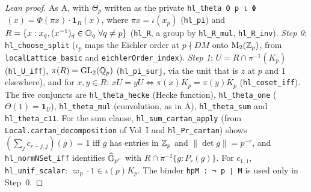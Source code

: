\begin{proof}[Lean proof]
As A, with $\Theta_p$ written as the private \texttt{hl\_theta O p ι Φ}$\,(x)=\Phi(\pi x)\cdot\mathbf 1_R(x)$, where $\pi x=\iota(x_p)$ (\texttt{hl\_pi}) and $R=\{x:x_q,(x^{-1})_q\in\mathbb{O}_q\ \forall q\neq p\}$ (\texttt{hl\_R}, a group by \texttt{hl\_R\_mul}, \texttt{hl\_R\_inv}). \emph{Step 0}: \texttt{hl\_choose\_split} ($\iota_p$ maps the Eichler order at $p\nmid DM$ onto $\mathrm{M}_2(\mathbb{Z}_p)$, from \texttt{localLattice\_basic} and \texttt{eichlerOrder\_index}). \emph{Step 1}: $U=R\cap\pi^{-1}(K_p)$ (\texttt{hl\_U\_iff}), $\pi(R)=\mathrm{GL}_2(\mathbb{Q}_p)$ (\texttt{hl\_pi\_surj}, via the unit that is $z$ at $p$ and $1$ elsewhere), and for $x,y\in R$: $xU=yU\iff\pi(x)K_p=\pi(y)K_p$ (\texttt{hl\_coset\_iff}). The five conjuncts are \texttt{hl\_theta\_hecke} (Hecke function), \texttt{hl\_theta\_one} ($\Theta(1)=\mathbf 1_U$), \texttt{hl\_theta\_mul} (convolution, as in A), \texttt{hl\_theta\_sum} and \texttt{hl\_theta\_c11}. For the sum clause, \texttt{hl\_sum\_cartan\_apply} (from \texttt{Local.cartan\_decomposition} of Vol~I and \texttt{hl\_Pr\_cartan}) shows $(\sum_{j}c_{r-j,j})(g)=1$ iff $g$ has entries in $\mathbb{Z}_p$ and $\|\det g\|=p^{-r}$, and \texttt{hl\_normNSet\_iff} identifies $\widehat{\mathbb{O}}_{p^r}$ with $R\cap\pi^{-1}\{g:P_r(g)\}$. For $c_{1,1}$, \texttt{hl\_unif\_scalar}: $\varpi_p\cdot1\in\iota(p)K_p$. The binder \texttt{hpM : ¬ p ∣ M} is used only in Step~0.
\end{proof}

